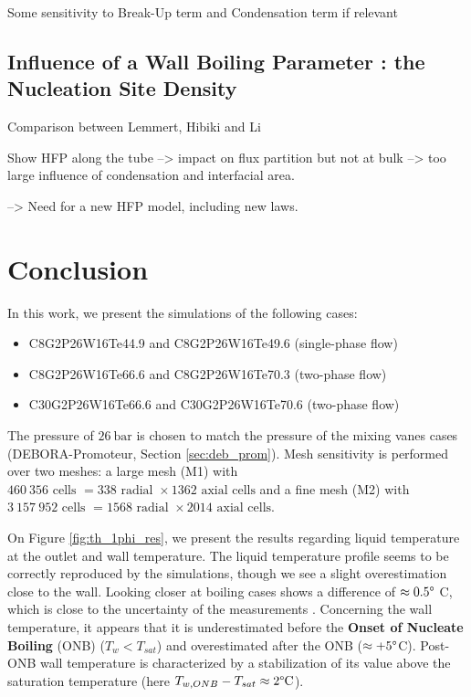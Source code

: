 Some sensitivity to Break-Up term and Condensation term if relevant


\subsection{Influence of a Wall Boiling Parameter : the Nucleation Site Density}

Comparison between Lemmert, Hibiki and Li

Show HFP along the tube --> impact on flux partition but not at bulk --> too large influence of condensation and interfacial area.

--> Need for a new HFP model, including new laws. 



\section{Conclusion}

\clearpage









In this work, we present the simulations of the following cases:
\begin{itemize}
\item C8G2P26W16Te44.9 and C8G2P26W16Te49.6 (single-phase flow)
\item C8G2P26W16Te66.6 and C8G2P26W16Te70.3 (two-phase flow)
\item C30G2P26W16Te66.6 and C30G2P26W16Te70.6 (two-phase flow)
\end{itemize}

The pressure of $26~\text{bar}$ is chosen to match the pressure of the mixing vanes cases (DEBORA-Promoteur, Section \ref{sec:deb_prom}). Mesh sensitivity is performed over two meshes: a large mesh (M1) with $460~356\text{ cells }=338\text{ radial } \times 1362 \text{ axial cells}$ and a fine mesh (M2) with $3~157~952\text{ cells }=1568\text{ radial } \times 2014 \text{ axial cells}$.

On Figure \ref{fig:th_1phi_res}, we present the results regarding liquid temperature at the outlet and wall temperature. The liquid temperature profile seems to be correctly reproduced by the simulations, though we see a slight overestimation close to the wall. Looking closer at boiling cases shows a difference of $\approx 0.5\degree$ C, which is close to the uncertainty of the measurements \cite{garnier_local_2001}. Concerning the wall temperature, it appears that it is underestimated before the \textbf{Onset of Nucleate Boiling} (ONB) ($T_{w}<T_{sat}$) and overestimated after the ONB ($\approx +5\degree$C). Post-ONB wall temperature is characterized by a stabilization of its value above the saturation temperature (here $T_{w,ONB}-T_{sat}\approx 2\degree\text{C}$).

